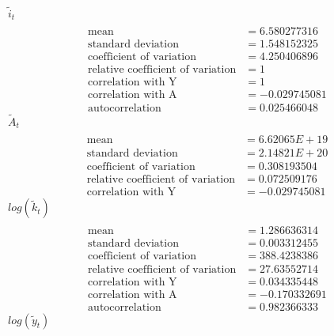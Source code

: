 \documentclass[letterpaper,12pt]{article}
\theoremstyle{definition}
\begin{document}
\\
$\tilde{i}_t$
\begin{align*}
\\\text{mean} &= 6.580277316
\\\text{standard deviation} &= 1.548152325
\\\text{coefficient of variation}&=4.250406896
\\\text{relative coefficient of variation}&=1
\\\text{correlation with Y}&=1
\\\text{correlation with A}&=-0.029745081
\\\text{autocorrelation}&=0.025466048
\end{align*}
$\tilde{A}_t$
\begin{align*}
\\\text{mean} &= 6.62065E+19
\\\text{standard deviation} &= 2.14821E+20
\\\text{coefficient of variation}&=0.308193504
\\\text{relative coefficient of variation}&=0.072509176
\\\text{correlation with Y}&=-0.029745081
\end{align*}
$log(\tilde{k}_t)$
\begin{align*}
\\\text{mean} &= 1.286636314
\\\text{standard deviation} &= 0.003312455
\\\text{coefficient of variation}&=388.4238386
\\\text{relative coefficient of variation}&=27.63552714
\\\text{correlation with Y}&=0.034335448
\\\text{correlation with A}&=-0.170332691
\\\text{autocorrelation}&=0.982366333
\end{align*}
$log(\tilde{y}_t)$
\end{document}
